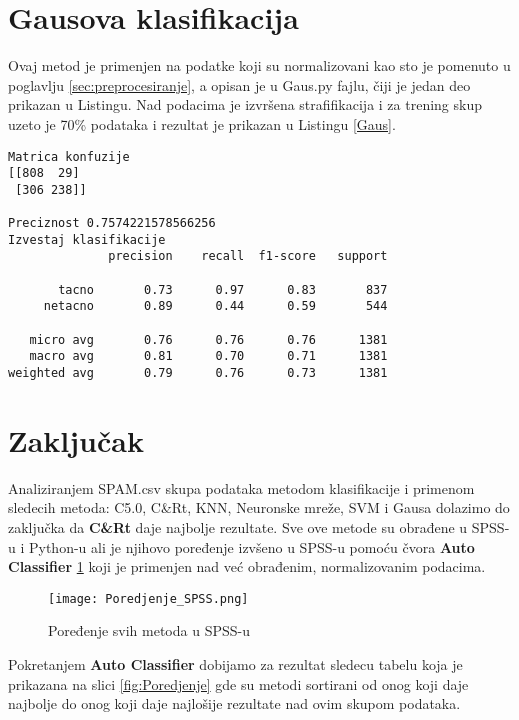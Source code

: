 \documentclass[a4paper]{article}
\begin{document}
\section{Gausova klasifikacija}
\label{sec:gaus}

Ovaj metod je primenjen na podatke koji su normalizovani kao sto je pomenuto u poglavlju \ref{sec:preprocesiranje}, a opisan je u Gaus.py fajlu, čiji je jedan deo prikazan u Listingu. Nad podacima je izvršena strafifikacija i za trening skup uzeto je 70\% podataka i rezultat je prikazan u Listingu \ref{Gaus}.

\begin{lstlisting}[caption={Rezultat nad trening podacima},frame=single, label=Gaus]
Matrica konfuzije
[[808  29]
 [306 238]]

Preciznost 0.7574221578566256
Izvestaj klasifikacije
              precision    recall  f1-score   support

       tacno       0.73      0.97      0.83       837
     netacno       0.89      0.44      0.59       544

   micro avg       0.76      0.76      0.76      1381
   macro avg       0.81      0.70      0.71      1381
weighted avg       0.79      0.76      0.73      1381

\end{lstlisting} 


\newpage

\section{Zaključak}
\label{sec:Zakljucak}

Analiziranjem SPAM.csv skupa podataka metodom klasifikacije i primenom sledecih metoda: C5.0, C\&Rt, KNN, Neuronske mreže, SVM i Gausa dolazimo do zaključka da \textbf{C\&Rt} daje najbolje rezultate. Sve ove metode su obrađene u SPSS-u i Python-u ali je njihovo poređenje izvšeno u SPSS-u pomoću čvora \textbf{Auto Classifier} \ref{fig:Poredjenje_SPSS} koji je primenjen nad već obrađenim, normalizovanim podacima. 

\begin{figure}[ht!]
    \centering
    \texttt{[image: Poredjenje\_SPSS.png]}
    \caption{Poređenje svih metoda u SPSS-u}
    \label{fig:Poredjenje_SPSS}
\end{figure}

Pokretanjem \textbf{Auto Classifier} dobijamo za rezultat sledecu tabelu koja je prikazana na slici  \ref{fig:Poredjenje} gde su metodi sortirani od onog koji daje najbolje do onog koji daje najlošije rezultate nad ovim skupom podataka.
\end{document}

